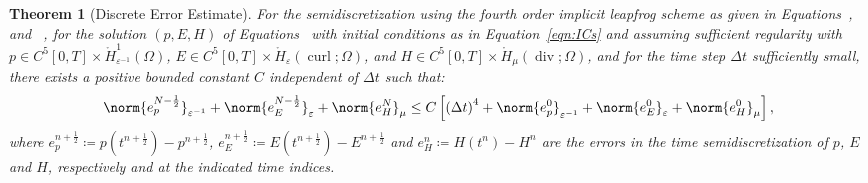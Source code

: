 \documentclass{amsart}
\theoremstyle{thmstyleone}%
\newtheorem{theorem}{Theorem}%
\theoremstyle{thmstyletwo}%
\theoremstyle{thmstylethree}%
\DeclareMathOperator{\curl}{curl}
\def\divgn{\operatorname{div}}
\begin{document}
\begin{theorem}[Discrete Error Estimate]\label{thm:dscrt_error_estmt_lf4}
For the semidiscretization using the fourth order implicit leapfrog scheme as given in Equations~, and ~, for the solution $(p, E, H)$ of Equations~ with initial conditions as in Equation~\eqref{eqn:ICs} and assuming sufficient regularity with $p \in C^5[0, T] \times \mathring{H}^1_{\varepsilon^{-1}}(\Omega)$, $E \in C^5[0, T] \times \mathring{H}_{\varepsilon}(\curl; \Omega)$, and $H \in C^5[0, T] \times \mathring{H}_{\mu}(\divgn; \Omega)$, and for the time step $\Delta t$ sufficiently small, there exists a positive bounded constant $C$ independent of $\Delta t$ such that:
\[
  \norm{e_p^{N - \frac{1}{2}}}_{\varepsilon^{-1}} + \norm{e_E^{N - \frac{1}{2}}}_{\varepsilon} + \norm{e_H^N}_{\mu} \le C \left[ \left(\Delta t\right)^4 + \norm{e_p^0}_{\varepsilon^{-1}} + \norm{e_E^0}_{\varepsilon} + \norm{e_H^0}_{\mu} \right],
\]
where $e_p^{n + \frac{1}{2}} \coloneq p(t^{n + \frac{1}{2}}) - p^{n+\frac{1}{2}}$, $e_E^{n + \frac{1}{2}} \coloneq E(t^{n + \frac{1}{2}}) - E^{n + \frac{1}{2}}$ and $e_H^n \coloneq H(t^n) - H^n$ are the errors in the time semidiscretization of $p$, $E$ and $H$, respectively and at the indicated time indices.
\end{theorem}
\end{document}
